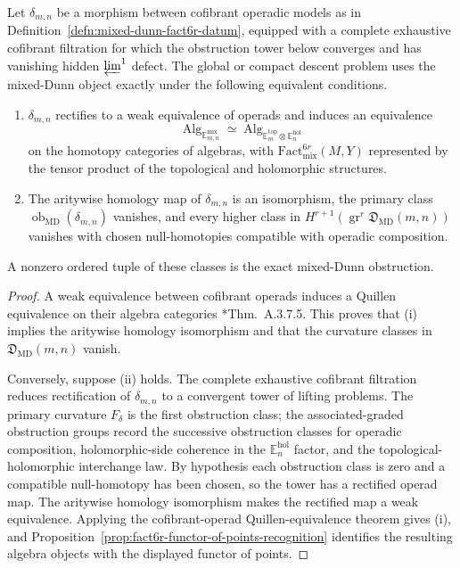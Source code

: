 \begin{thm}\label{thm:mixed-dunn-criterion}
  Let \(\delta_{m,n}\) be a morphism between cofibrant operadic models as
  in Definition~\ref{defn:mixed-dunn-fact6r-datum}, equipped with a
  complete exhaustive cofibrant filtration for which the obstruction
  tower below converges and has vanishing hidden \(\varprojlim^1\) defect.
  The global or compact descent problem uses the mixed-Dunn object exactly
  under the following equivalent conditions.
  \begin{enumerate}[label=(\roman*)]
    \item \(\delta_{m,n}\) rectifies to a weak equivalence of operads and
      induces an equivalence
      \[
        \operatorname{Alg}_{\mathbb E_{m,n}^{\mathrm{mix}}}
          \simeq
        \operatorname{Alg}_{\mathbb E_m^{\mathrm{top}}\otimes
          \mathbb E_n^{\mathrm{hol}}}
      \]
      on the homotopy categories of algebras, with
      \(\mathrm{Fact}^{6r}_{\mathrm{mix}}(M,Y)\) represented by the
      tensor product of the topological and holomorphic structures.
    \item The aritywise homology map of \(\delta_{m,n}\) is an
      isomorphism, the primary class
      \(\operatorname{ob}_{\mathrm{MD}}(\delta_{m,n})\) vanishes, and
      every higher class in
      \(H^{r+1}(\operatorname{gr}^r\mathfrak D_{\mathrm{MD}}(m,n))\)
      vanishes with chosen null-homotopies compatible with operadic
      composition.
  \end{enumerate}
  A nonzero ordered tuple of these classes is the exact
  mixed-Dunn obstruction.
\end{thm}

\begin{proof}
  A weak equivalence between cofibrant operads induces a Quillen
  equivalence on their algebra categories
  \cite{lurie-ha}*{Thm.~A.3.7.5}.  This proves that (i) implies the
  aritywise homology isomorphism and that the curvature classes in
  \(\mathfrak D_{\mathrm{MD}}(m,n)\) vanish.

  Conversely, suppose (ii) holds.  The complete exhaustive cofibrant
  filtration reduces rectification of \(\delta_{m,n}\) to a convergent
  tower of lifting problems.  The
	  primary curvature \(F_\delta\) is the first obstruction class;
  the associated-graded obstruction groups record the successive
  obstruction classes for operadic composition, holomorphic-side coherence in the
  \(\mathbb E_n^{\mathrm{hol}}\) factor, and the
  topological-holomorphic interchange law.  By hypothesis each
  obstruction class is zero and a compatible null-homotopy has been
  chosen, so the tower has a rectified operad map.  The aritywise
  homology isomorphism makes the rectified map a weak equivalence.
  Applying the cofibrant-operad Quillen-equivalence theorem gives
  (i), and
  Proposition~\ref{prop:fact6r-functor-of-points-recognition}
  identifies the resulting algebra objects with the displayed functor
  of points.
\end{proof}

